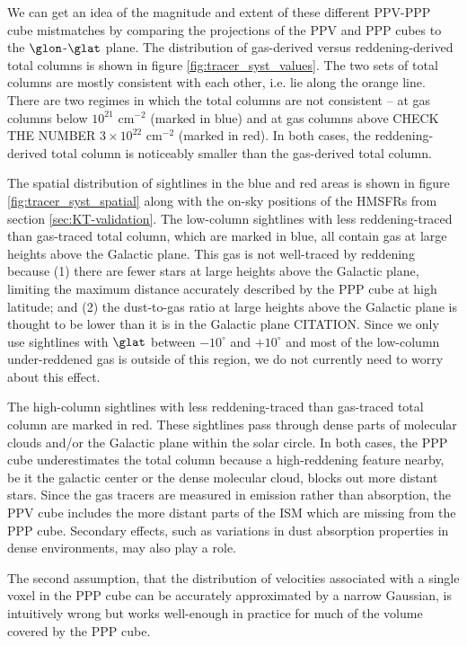We can get an idea of the magnitude and extent of these different PPV-PPP cube mistmatches by comparing the projections of the PPV and PPP cubes to the $\glon$-$\glat$ plane. 
The distribution of gas-derived versus reddening-derived total columns is shown in figure \ref{fig:tracer_syst_values}. 
The two sets of total columns are mostly consistent with each other, i.e. lie along the orange line. 
There are two regimes in which the total columns are not consistent -- at gas columns below $10^{21}$ cm$^{-2}$ (marked in  blue) and at gas columns above CHECK THE NUMBER $3 \times 10^{22}$ cm$^{-2}$ (marked in red). 
In both cases, the reddening-derived total column is noticeably smaller than the gas-derived total column.

The spatial distribution of sightlines in the blue and red areas is shown in figure \ref{fig:tracer_syst_spatial} along with the on-sky positions of the HMSFRs from section \ref{sec:KT-validation}. 
The low-column sightlines with less reddening-traced than gas-traced total column, which are marked in blue, all contain gas at large heights above the Galactic plane. 
This gas is not well-traced by reddening because (1) there are fewer stars at large heights above the Galactic plane, limiting the maximum distance accurately described by the PPP cube at high latitude; and (2) the dust-to-gas ratio at large heights above the Galactic plane is thought to be lower than it is in the Galactic plane CITATION. 
Since we only use sightlines with $\glat$ between $-10^\circ$ and $+10^\circ$ and most of the low-column under-reddened gas is outside of this region, we do not currently need to worry about this effect.

The high-column sightlines with less reddening-traced than gas-traced total column are marked in red.
These sightlines pass through dense parts of molecular clouds and/or the Galactic plane within the solar circle. 
In both cases, the PPP cube underestimates the total column because a high-reddening feature nearby, be it the galactic center or the dense molecular cloud, blocks out more distant stars. 
Since the gas tracers are measured in emission rather than absorption, the PPV cube includes the more distant parts of the ISM which are missing from the PPP cube. 
Secondary effects, such as variations in dust absorption properties in dense environments, may also play a role.


The second assumption, that the distribution of velocities associated with a single voxel in the PPP cube can be accurately approximated by a narrow Gaussian, is intuitively wrong but works well-enough in practice for much of the volume covered by the PPP cube.

